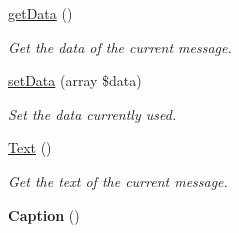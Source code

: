 \begin{DoxyCompactItemize}
\hyperlink{class_telegram_a81a67162a6288d78fc4c55283325f0b4}{get\-Data} ()
\begin{DoxyCompactList}\small\item\em Get the data of the current message. \end{DoxyCompactList}\item 
\hypertarget{class_telegram_a87449bdd364c33ff024d32896342bf31}{\hyperlink{class_telegram_a87449bdd364c33ff024d32896342bf31}{set\-Data} (array \$data)}\label{class_telegram_a87449bdd364c33ff024d32896342bf31}

\begin{DoxyCompactList}\small\item\em Set the data currently used. \end{DoxyCompactList}\item 
\hyperlink{class_telegram_a950a98ae75562dc9c6a458acbd330143}{Text} ()
\begin{DoxyCompactList}\small\item\em Get the text of the current message. \end{DoxyCompactList}\item 
\hypertarget{class_telegram_a07507e380581a106bb2af2cbae4d7ff1}{{\bfseries Caption} ()}\label{class_telegram_a07507e380581a106bb2af2cbae4d7ff1}


\end{DoxyCompactItemize}
